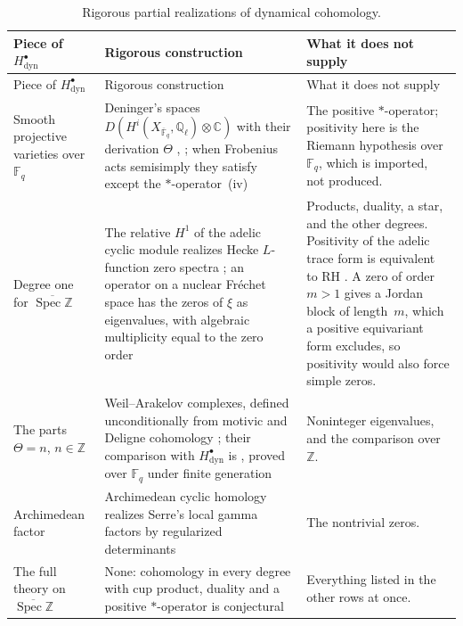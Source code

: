 \documentclass[11pt]{amsart}
\theoremstyle{plain}
\theoremstyle{definition}
\theoremstyle{remark}
\numberwithin{equation}{section}
\newcommand{\C}{\mathbb{C}}
\newcommand{\Q}{\mathbb{Q}}
\newcommand{\Z}{\mathbb{Z}}
\newcommand{\F}{\mathbb{F}}
\DeclareMathOperator{\Spec}{Spec}
\begin{document}
{\small
\setlength{\tabcolsep}{4pt}
\begin{longtable}{@{}>{\raggedright\arraybackslash}p{}
  >{\raggedright\arraybackslash}p{}
  >{\raggedright\arraybackslash}p{}@{}}
\caption{Rigorous partial realizations of dynamical cohomology.}
\label{tab:dyn-realizations}\\
\toprule
Piece of $H^\bullet_{\mathrm{dyn}}$ & Rigorous construction &
What it does not supply\\
\midrule
\endfirsthead
\toprule
Piece of $H^\bullet_{\mathrm{dyn}}$ & Rigorous construction &
What it does not supply\\
\midrule
\endhead
Smooth projective varieties over $\F_q$ &
Deninger's spaces $D(H^i(X_{\overline{\F}_q},\Q_\ell)\otimes\C)$ with
their derivation $\Theta$ \cite{Deninger1992Local},
\cite[\S4.2, (7)]{FlachMorin2020DeningerWeilArakelov}; when Frobenius
acts semisimply they satisfy
\cite[Conj.~2.3]{FlachMorin2020DeningerWeilArakelov} except the
$*$-operator~(iv) &
The positive $*$-operator; positivity here is the Riemann hypothesis
over $\F_q$, which is imported, not produced.\\
Degree one for $\overline{\Spec\Z}$ &
The relative $H^1$ of the adelic cyclic module realizes Hecke
$L$-function zero spectra
\cite[Def.~4.10, Prop.~4.13]{ConnesConsaniMarcolli2009Weil}; an
operator on a nuclear Fr\'echet space has the zeros of $\xi$ as
eigenvalues, with algebraic multiplicity equal to the zero order
\cite[Thm.~4.1, Cor.~4.2]{Meyer2005SpectralZeta} &
Products, duality, a star, and the other degrees. Positivity of the
adelic trace form is equivalent to RH
\cite[Cor.~6.3]{ConnesConsaniMarcolli2009Weil}. A zero of order $m>1$
gives a Jordan block of length~$m$, which a positive equivariant form
excludes, so positivity would also force simple zeros.\\
The parts $\Theta=n$, $n\in\Z$ &
Weil--Arakelov complexes, defined unconditionally from motivic and
Deligne cohomology
\cite[\S3]{FlachMorin2020DeningerWeilArakelov}; their comparison with
$H^\bullet_{\mathrm{dyn}}$ is
\cite[Conj.~4.1]{FlachMorin2020DeningerWeilArakelov}, proved over
$\F_q$ under finite generation
\cite[Thm.~4.3]{FlachMorin2020DeningerWeilArakelov} &
Noninteger eigenvalues, and the comparison over $\Z$.\\
Archimedean factor &
Archimedean cyclic homology realizes Serre's local gamma factors by
regularized determinants \cite[Thm.~1.1]{ConnesConsani2014CyclicSerre} &
The nontrivial zeros.\\
The full theory on $\overline{\Spec\Z}$ &
None: cohomology in every degree with cup product, duality and a
positive $*$-operator is conjectural
\cite[Conj.~2.3]{FlachMorin2020DeningerWeilArakelov} &
Everything listed in the other rows at once.\\
\bottomrule
\end{longtable}
}
\end{document}

